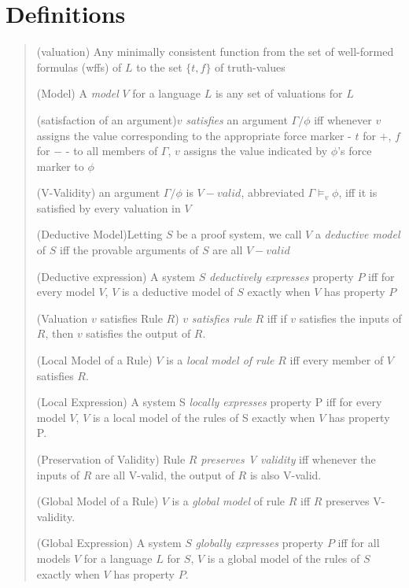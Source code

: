 \documentclass[]{article}
\begin{document}
\section{Definitions}
\begin{quote}
(valuation) Any minimally consistent function from the set of well-formed formulas (wffs) of $L$ to the set $\{t, f\}$ of truth-values

(Model) A \textit{model} $V$ for a language $L$ is any set of valuations for $L$

(satisfaction of an argument)$v$ \textit{satisfies} an argument $\Gamma / \phi$ iff whenever $v$ assigns the value corresponding to the appropriate force marker - $t$ for $+$, $f$ for $-$ - to all members of $\Gamma$, $v$ assigns the value indicated by $\phi$'s force marker to $\phi$

(V-Validity) an argument $\Gamma / \phi$ is $V-valid$, abbreviated $\Gamma \models_{v} \phi$, iff it is satisfied by every valuation in $V$

(Deductive Model)Letting $S$ be a proof system, we call $V$ a \textit{deductive model} of $S$ iff the provable arguments of $S$ are all $V-valid$

(Deductive expression) A system $S$ \textit{deductively expresses} property $P$ iff for every model $V$, $V$ is a deductive model of $S$ exactly when $V$ has property $P$

(Valuation $v$ satisfies Rule $R$) $v$ \textit{satisfies rule} $R$ iff if $v$ satisfies the inputs of $R$, then $v$ satisfies the output of $R$.

(Local Model of a Rule) $V$ is a \textit{local model of rule} $R$ iff every member of $V$ satisfies $R$.

(Local Expression) A system S \textit{locally expresses} property P iff for every model $V$, $V$ is a local model of the rules of S exactly when $V$ has property P.

(Preservation of Validity) Rule $R$ \textit{preserves V validity} iff whenever the inputs of $R$ are all V-valid, the output of $R$ is also V-valid.

(Global Model of a Rule) $V$ is a \textit{global model} of rule $R$ iff $R$ preserves V-validity.

(Global Expression) A system $S$ \textit{globally expresses} property $P$ iff for all models $V$ for a language $L$ for $S$, $V$ is a global model of the rules of $S$ exactly when $V$ has property $P$.
\end{quote}
\end{document}
